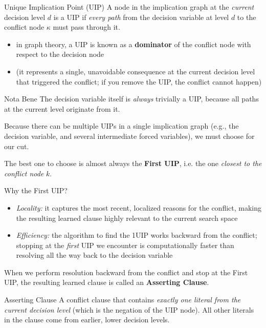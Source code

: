 \documentclass[a4paper, 11pt]{report}
\begin{document}
\begin{defframe}{Unique Implication Point (UIP)}{}
 A node in the implication graph at the \textit{current} decision level $d$ is a UIP if \textit{every path} from the decision variable at level $d$ to the conflict node $\kappa$ must pass through it.
\begin{itemize}
    \item in graph theory, a UIP is known as a \textbf{dominator} of the conflict node with respect to the decision node
    \item (it represents a single, unavoidable consequence at the current decision level that triggered the conflict; if you remove the UIP, the conflict cannot happen)
\end{itemize}
        \begin{gframe}{Nota Bene}
The decision variable itself is \textit{always} trivially a UIP, because all paths at the current level originate from it.
        \end{gframe}
\end{defframe}

Because there can be multiple UIPs in a single implication graph (e.g., the decision variable, and several intermediate forced variables), we must choose for our cut.

The best one to choose is almost always the \textbf{First UIP}, i.e. the one \textit{closest to the conflict node} $k$.

\begin{gframe}{Why the First UIP?}
        \begin{itemize}
        \item \textit{Locality:} it captures the most recent, localized reasons for the conflict, making the resulting learned clause highly relevant to the current search space
        \item \textit{Efficiency:} the algorithm to find the 1UIP works backward from the conflict; stopping at the \textit{first} UIP we encounter is computationally faster than resolving all the way back to the decision variable
    \end{itemize}
\end{gframe}

When we perform resolution backward from the conflict and stop at the First UIP, the resulting learned clause is called an \textbf{Asserting Clause}. 

\begin{defframe}{Asserting Clause}{}
 A conflict clause that contains \textit{exactly one literal from the current decision level} (which is the negation of the UIP node). All other literals in the clause come from earlier, lower decision levels.
\end{defframe}
\end{document}
